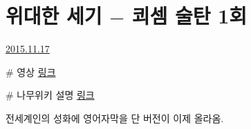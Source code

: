 \section{위대한 세기 $-$ 쾨셈 술탄 1회}
\href{https://www.kockoc.com/Apoc/495243}{2015.11.17}

\vspace{5mm}

$\#$ 영상
\href{http://www.alaturcaseries.com/magnificent-century-kosem-episode-1-with-english-subtitles/}{링크}
\vspace{5mm}

$\#$ 나무위키 설명
\href{https://namu.wiki/w/%EB%AC%B4%ED%9D%90%ED%85%8C%EC%86%80%20%EC%9C%A0%EC%A6%88%EC%9D%B4%EC%9D%84:%20%EC%BE%A8%EC%85%88?from=%EC%9C%84%EB%8C%80%ED%95%9C%20%EC%84%B8%EA%B8%B0%3A%20%EC%BE%A8%EC%85%88}{링크}
\vspace{5mm}

전세계인의 성화에 영어자막을 단 버전이 이제 올라옴.
\vspace{5mm}

